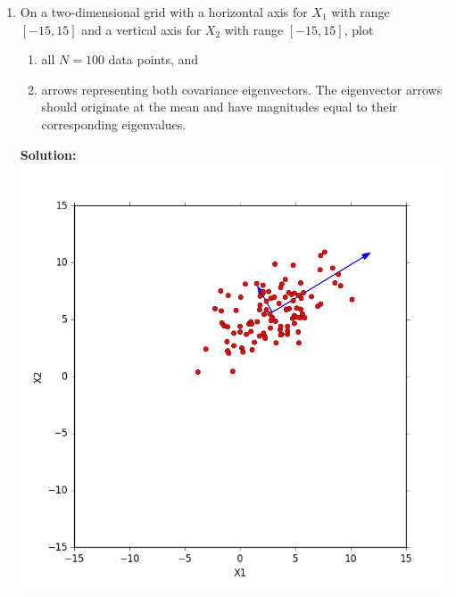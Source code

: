 \documentclass{article}
\newcommand{\solution}{\textbf{Solution: }}
\begin{document}
\begin{enumerate}[label=(\alph*)]
    \item On a two-dimensional grid with a horizontal axis for $X_1$ with range $[-15, 15]$ and a vertical axis for $X_2$ with range $[-15, 15]$, plot
    \begin{enumerate}[label=(\roman*)]
        \item all $N=100$ data points, and
        \item arrows representing both covariance eigenvectors. The eigenvector arrows should originate at the mean and have magnitudes equal to their corresponding eigenvalues.
    \end{enumerate}
    \begin{mdframed} \solution
    \includegraphics[scale=.5]{images/eigenvector_d.png}
    \end{mdframed}
    

\end{enumerate}
\end{document}
